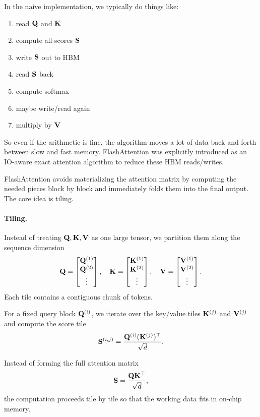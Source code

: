 \documentclass[11pt]{article}  %
\begin{document}
In the naive implementation, we typically do things like:
\begin{enumerate}
  \item read $\mathbf{Q}$ and $\mathbf{K}$
  \item compute all scores $\mathbf{S}$
  \item write $\mathbf{S}$ out to HBM
  \item read $\mathbf{S}$ back 
  \item compute softmax
  \item maybe write/read again
  \item multiply by $\mathbf{V}$
\end{enumerate}
So even if the arithmetic is fine, the algorithm moves a lot of data back and forth between slow and fast memory. FlashAttention was explicitly introduced as an IO-aware exact attention algorithm to reduce these HBM reads/writes.

FlashAttention avoids materializing the attention matrix by computing the needed pieces block by block and immediately folds them into the final output.
The core idea is tiling.

\paragraph{Tiling.}
Instead of treating $\mathbf{Q}, \mathbf{K}, \mathbf{V}$ as one large tensor, we partition them
along the sequence dimension
\[
\mathbf{Q}=\begin{bmatrix}\mathbf{Q}^{(1)}\\\mathbf{Q}^{(2)}\\\vdots\end{bmatrix},\quad
\mathbf{K}=\begin{bmatrix}\mathbf{K}^{(1)}\\\mathbf{K}^{(2)}\\\vdots\end{bmatrix},\quad
\mathbf{V}=\begin{bmatrix}\mathbf{V}^{(1)}\\\mathbf{V}^{(2)}\\\vdots\end{bmatrix}.
\]
Each tile contains a contiguous chunk of tokens.

For a fixed query block $\mathbf{Q}^{(i)}$, we iterate over the key/value tiles
$\mathbf{K}^{(j)}$ and $\mathbf{V}^{(j)}$ and compute the score tile
\begin{align*}
\mathbf{S}^{(i,j)} = \frac{\mathbf{Q}^{(i)}(\mathbf{K}^{(j)})^\top}{\sqrt{d}} .
\end{align*}

Instead of forming the full attention matrix
\[
\mathbf{S}=\frac{\mathbf{Q}\mathbf{K}^\top}{\sqrt{d}},
\]
the computation proceeds tile by tile so that the working data fits in
on-chip memory.
\end{document}
